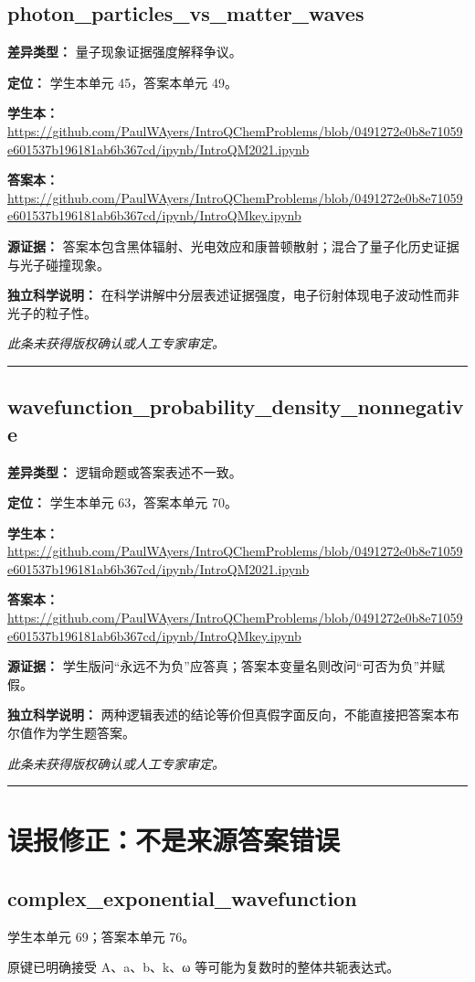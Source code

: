 \documentclass[UTF8,11pt,oneside,openany,fontset=none]{ctexbook}
\begin{document}
\section{photon\_particles\_vs\_matter\_waves}
\noindent\textbf{差异类型：} 量子现象证据强度解释争议。\par
\noindent\textbf{定位：} 学生本单元 45，答案本单元 49。\par
\noindent\textbf{学生本：} \url{https://github.com/PaulWAyers/IntroQChemProblems/blob/0491272e0b8e71059e601537b196181ab6b367cd/ipynb/IntroQM2021.ipynb}\par
\noindent\textbf{答案本：} \url{https://github.com/PaulWAyers/IntroQChemProblems/blob/0491272e0b8e71059e601537b196181ab6b367cd/ipynb/IntroQMkey.ipynb}\par
\noindent\textbf{源证据：} 答案本包含黑体辐射、光电效应和康普顿散射；混合了量子化历史证据与光子碰撞现象。\par
\noindent\textbf{独立科学说明：} 在科学讲解中分层表述证据强度，电子衍射体现电子波动性而非光子的粒子性。\par
\medskip\noindent\textit{此条未获得版权确认或人工专家审定。}
\medskip\hrule\medskip
\section{wavefunction\_probability\_density\_nonnegative}
\noindent\textbf{差异类型：} 逻辑命题或答案表述不一致。\par
\noindent\textbf{定位：} 学生本单元 63，答案本单元 70。\par
\noindent\textbf{学生本：} \url{https://github.com/PaulWAyers/IntroQChemProblems/blob/0491272e0b8e71059e601537b196181ab6b367cd/ipynb/IntroQM2021.ipynb}\par
\noindent\textbf{答案本：} \url{https://github.com/PaulWAyers/IntroQChemProblems/blob/0491272e0b8e71059e601537b196181ab6b367cd/ipynb/IntroQMkey.ipynb}\par
\noindent\textbf{源证据：} 学生版问“永远不为负”应答真；答案本变量名则改问“可否为负”并赋假。\par
\noindent\textbf{独立科学说明：} 两种逻辑表述的结论等价但真假字面反向，不能直接把答案本布尔值作为学生题答案。\par
\medskip\noindent\textit{此条未获得版权确认或人工专家审定。}
\medskip\hrule\medskip
\chapter{误报修正：不是来源答案错误}
\section{complex\_exponential\_wavefunction}
\noindent 学生本单元 69；答案本单元 76。\par
\noindent 原键已明确接受 A、a、b、k、ω 等可能为复数时的整体共轭表达式。\par
\end{document}
